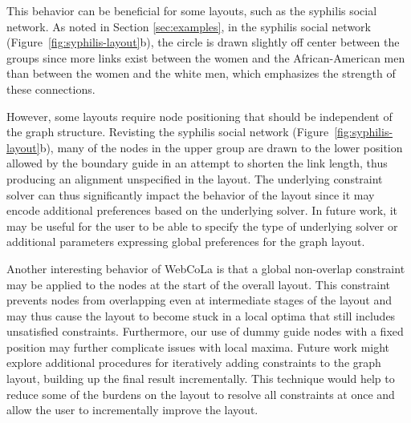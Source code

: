 This behavior can be beneficial for some layouts, such as the syphilis social network.
As noted in Section \ref{sec:examples}, in the syphilis social network
(Figure~\ref{fig:syphilis-layout}b), the circle is drawn slightly off
center between the groups since more links exist between the
women and the African-American men than between the women and
the white men, which emphasizes the strength of these
connections.

However, some layouts require node positioning that should be
independent of the graph structure. Revisting the syphilis social network
(Figure~\ref{fig:syphilis-layout}b), many of the nodes in the upper group
are drawn to the lower position allowed by the boundary guide in an attempt
to shorten the link length, thus producing an alignment unspecified in the
layout. The underlying constraint solver can thus significantly impact the
behavior of the layout since it may encode additional preferences based on
the underlying solver. In future work, it may be useful for the user to be able
to specify the type of underlying solver or additional parameters expressing
global preferences for the graph layout.

Another interesting behavior of WebCoLa is that a global non-overlap constraint
may be applied to the nodes at the start of the overall layout. This constraint
prevents nodes from overlapping even at intermediate stages of the layout and
may thus cause the layout to become stuck in a local optima that still
includes unsatisfied constraints. Furthermore, our use of
dummy guide nodes with a fixed position may further complicate issues
with local maxima. Future work might explore additional procedures for
iteratively adding constraints to the graph layout, building up the final
result incrementally. This technique would help to reduce some of the burdens
on the layout to resolve all constraints at once and allow the user to
incrementally improve the layout.
